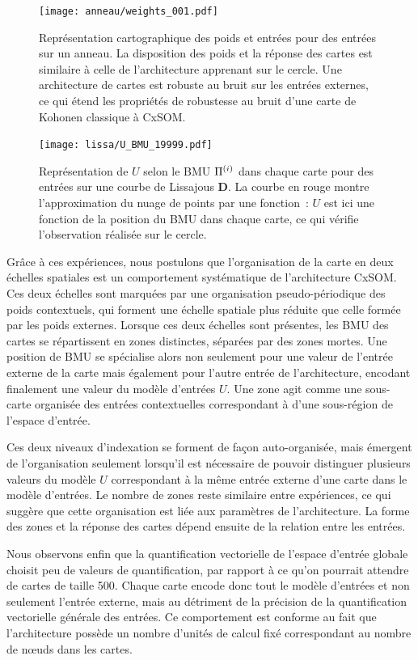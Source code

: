 \documentclass[../main]{subfiles}
\begin{document}
\begin{figure}
\begin{minipage}{\textwidth}
	\centering\texttt{[image: anneau/weights\_001.pdf]}
	\caption{Représentation cartographique des poids et entrées pour des entrées sur un anneau. La disposition des poids et la réponse des cartes est similaire à celle de l'architecture apprenant sur le cercle. Une architecture de cartes est robuste au bruit sur les entrées externes, ce qui étend les propriétés de robustesse au bruit d'une carte de Kohonen classique à CxSOM. \label{fig:anneau_w}}
\end{minipage}
\end{figure}

\begin{figure}[t]
	\centering\texttt{[image: lissa/U\_BMU\_19999.pdf]}
	\caption{Représentation de $U$ selon le BMU $\Pi^{({i})}$ dans chaque carte pour des entrées sur une courbe de Lissajous \textbf{D}. La courbe en rouge montre l'approximation du nuage de points par une fonction~: $U$ est ici une fonction de la position du BMU dans chaque carte, ce qui vérifie l'observation réalisée sur le cercle.\label{fig:u_bmu_lissa}}
\end{figure}


Grâce à ces expériences, nous postulons que l'organisation de la carte en deux échelles spatiales est un comportement systématique de l'architecture CxSOM. Ces deux échelles sont marquées par une organisation pseudo-périodique des poids contextuels, qui forment une échelle spatiale plus réduite que celle formée par les poids externes. Lorsque ces deux échelles sont présentes, les BMU des cartes se répartissent en zones distinctes, séparées par des zones mortes.
Une position de BMU se spécialise alors non seulement pour une valeur de l'entrée externe de la carte mais également pour l'autre entrée de l'architecture, encodant finalement une valeur du modèle d'entrées $U$. Une zone agit comme une sous-carte organisée des entrées contextuelles correspondant à d'une sous-région de l'espace d'entrée.

Ces deux niveaux d'indexation se forment de façon auto-organisée, mais émergent de l'organisation seulement lorsqu'il est nécessaire de pouvoir distinguer plusieurs valeurs du modèle $U$ correspondant à la même entrée externe d'une carte dans le modèle d'entrées.
Le nombre de zones reste similaire entre expériences, ce qui suggère que cette organisation est liée aux paramètres de l'architecture.
La forme des zones et la réponse des cartes dépend ensuite de la relation entre les entrées.

Nous observons enfin que la quantification vectorielle de l'espace d'entrée globale choisit peu de valeurs de quantification, par rapport à ce qu'on pourrait attendre de cartes de taille 500.
Chaque carte encode donc tout le modèle d'entrées et non seulement l'entrée externe, mais au détriment de la précision de la quantification vectorielle générale des entrées. Ce comportement est conforme au fait que l'architecture possède un nombre d'unités de calcul fixé correspondant au nombre de n\oe{}uds dans les cartes.
\end{document}
